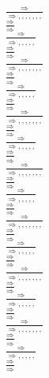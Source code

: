 \documentclass[11pt]{article}
\begin{document}
\begin{center}
\bigskip
\\$\frac{\Rightarrow }{\Rightarrow , , , , , , , }$
\bigskip
\\$\frac{\Rightarrow }{\Rightarrow }$
\bigskip
\\$\frac{\Rightarrow }{\Rightarrow , , , , , }$
\bigskip
\\$\frac{\Rightarrow }{\Rightarrow }$
\bigskip
\\$\frac{\Rightarrow }{\Rightarrow , , , , , , , }$
\bigskip
\\$\frac{\Rightarrow }{\Rightarrow }$
\bigskip
\\$\frac{\Rightarrow }{\Rightarrow , , , , , }$
\bigskip
\\$\frac{\Rightarrow }{\Rightarrow }$
\bigskip
\\$\frac{\Rightarrow }{\Rightarrow , , , , , , , }$
\bigskip
\\$\frac{\Rightarrow }{\Rightarrow }$
\bigskip
\\$\frac{\Rightarrow }{\Rightarrow , , , , , }$
\bigskip
\\$\frac{\Rightarrow }{\Rightarrow }$
\bigskip
\\$\frac{\Rightarrow }{\Rightarrow , , , , , , , }$
\bigskip
\\$\frac{\Rightarrow }{\Rightarrow }$
\bigskip
\\$\frac{\Rightarrow }{\Rightarrow , , , , , }$
\bigskip
\\$\frac{\Rightarrow }{\Rightarrow }$
\bigskip
\\$\frac{\Rightarrow }{\Rightarrow , , , , , , , }$
\bigskip
\\$\frac{\Rightarrow }{\Rightarrow }$
\bigskip
\\$\frac{\Rightarrow }{\Rightarrow , , , , , }$
\bigskip
\\$\frac{\Rightarrow }{\Rightarrow }$
\bigskip
\\$\frac{\Rightarrow }{\Rightarrow , , , , , , , }$
\bigskip
\\$\frac{\Rightarrow }{\Rightarrow }$
\bigskip
\\$\frac{\Rightarrow }{\Rightarrow , , , , , }$
\bigskip
\\$\frac{\Rightarrow }{\Rightarrow }$
\bigskip
\\$\frac{\Rightarrow }{\Rightarrow , , , , , , , }$
\bigskip
\\$\frac{\Rightarrow }{\Rightarrow }$
\bigskip
\\$\frac{\Rightarrow }{\Rightarrow , , , , , }$
\bigskip
\\$\frac{\Rightarrow }{\Rightarrow }$

\end{center}
\end{document}
